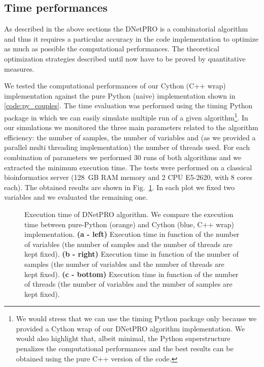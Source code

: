 \documentclass{standalone}
\begin{document}
\subsection[Time performances]{Time performances}\label{implementation:timing}

As described in the above sections the DNetPRO is a combinatorial algorithm and thus it requires a particular accuracy in the code implementation to optimize as much as possible the computational performances.
The theoretical optimization strategies described until now have to be proved by quantitative measures.

We tested the computational performances of our Cython (C++ wrap) implementation against the pure Python (naive) implementation shown in \ref{code:py_couples}.
The time evaluation was performed using the \textsf{timing} Python package in which we can easily simulate multiple run of a given algorithm\footnote{
  We would stress that we can use the \textsf{timing} Python package only because we provided a Cython wrap of our DNetPRO algorithm implementation.
  We would also highlight that, albeit minimal, the Python superstructure penalizes the computational performances and the best results can be obtained using the pure C++ version of the code.
}.
In our simulations we monitored the three main parameters related to the algorithm efficiency: the number of samples, the number of variables and (as we provided a parallel multi threading implementation) the number of threads used.
For each combination of parameters we performed 30 runs of both algorithms and we extracted the minimum execution time.
The tests were performed on a classical bioinformatics server (128~GB RAM memory and 2 CPU E5-2620, with 8 cores each).
The obtained results are shown in Fig.~\ref{fig:dnetpro_timing}.
In each plot we fixed two variables and we evaluated the remaining one.

\begin{figure}[htbp]
\hspace{-1.0cm}
\def\svgwidth{0.45\textwidth}

\qquad
\hspace{1.0cm}
\def\svgwidth{0.45\textwidth}

\qquad\qquad
\centering
\def\svgwidth{0.7\textwidth}

\caption{Execution time of DNetPRO algorithm.
We compare the execution time between pure-Python (orange) and Cython (blue, C++ wrap) implementation.
\textbf{(a - left)} Execution time in function of the number of variables (the number of samples and the number of threads are kept fixed).
\textbf{(b - right)} Execution time in function of the number of samples (the number of variables and the number of threads are kept fixed).
\textbf{(c - bottom)} Execution time in function of the number of threads (the number of variables and the number of samples are kept fixed).
}
\label{fig:dnetpro_timing}
\end{figure}
\end{document}
